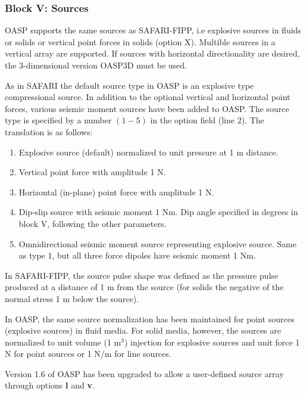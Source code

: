 \subsubsection{Block V: Sources}

    OASP supports the same sources as  SAFARI-FIPP,  i.e 
explosive sources in fluids or solids or vertical point forces in 
solids  (option  X).  Multible sources in a  vertical  array  are 
supported. If sources with horizontal directionality are desired, 
the 3-dimensional version OASP3D must be used.

\label{oaspsou}  

As in SAFARI the default source type in OASP 
is an explosive type compressional source. In addition to the optional
vertical and horizontal point forces, various seismic moment sources have  been
added to OASP. The source type is specified by a number $(1-5)$ in the
option field (line 2). The translation is as follows:
\begin{enumerate}
\item Explosive source (default) normalized to unit pressure at 1 m distance.
\item Vertical point force with amplitude 1 N.
\item Horizontal (in-plane) point force with amplitude 1 N.
\item Dip-slip source with seismic moment 1 Nm. Dip angle specified in 
      degrees in block V, following the other parameters.
\item Omnidirectional seismic moment source representing explosive source. Same as type 1, but all three force dipoles have seismic moment 1 Nm.
\end{enumerate}


    In  SAFARI-FIPP,  the source pulse shape was defined  as  the 
pressure pulse produced at a distance of 1 m from the source (for 
solids the negative of the normal stress 1 m below the source). 

    In  OASP, the same source normalization has been  maintained 
for point sources (explosive sources) in fluid media.
    For solid media, however, the sources are normalized to  unit 
volume (1 m$^3$) injection for explosive sources and unit force 
1 N for point sources or 1 N/m for line sources.

\label{oaspsar}

Version 1.6 of OASP has been upgraded to allow a user-defined source
array through options {\bf l} and {\bf v}. 

